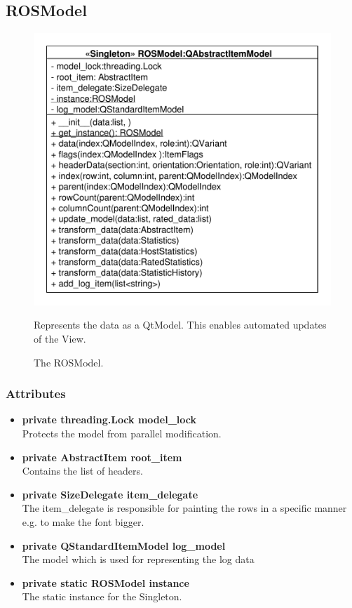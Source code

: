 \subsection{ROSModel}
\begin{figure}[htbp]
	\begin{minipage}[t]{7cm}
		\vspace{0pt}
		\centering
		\includegraphics[scale=0.6]{./diagram_pictures/ROSModel.pdf}
		\caption{The ROSModel.}
	\end{minipage}
	\hfill
	\begin{minipage}[t]{6cm}
		\vspace{10pt}		
		Represents the data as a QtModel. This enables automated updates of the View.
	\end{minipage}
\end{figure}
\subsubsection{Attributes}
\begin{itemize}
  \item \textbf{private threading.Lock model\_lock}\\ 
  Protects the model from parallel modification.
  \item \textbf{private AbstractItem root\_item}\\
  Contains the list of headers.
  \item \textbf{private SizeDelegate item\_delegate}\\
  The item\_delegate is responsible for painting the rows in a specific manner e.g. to make the font bigger.
  \item \textbf{private QStandardItemModel log\_model}\\ The model which is used for representing the log data
  \item \textbf{private static ROSModel instance}\\
   The static instance for the Singleton.
   
\end{itemize}
